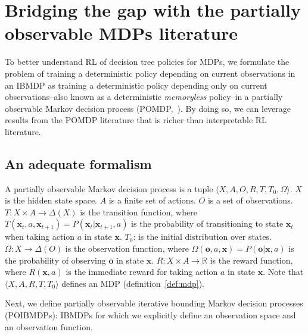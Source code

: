 \section{Bridging the gap with the partially observable MDPs literature}\label{sec:poibmdp}
To better understand RL of decision tree policies for MDPs, we formulate the problem of training a deterministic policy depending on current observations in an IBMDP as training a deterministic policy depending only on current observations--also known as a deterministic \emph{memoryless} policy--in a partially observable Markov decision process (POMDP,~\cite{POMDP,chap2}).
By doing so, we can leverage results from the POMDP literature that is richer than interpretable RL literature.

\subsection{An adequate formalism}
\begin{definition}\label{def:pomdp}
A partially observable Markov decision process is a tuple $\langle X, A, O, R, T, T_0, \Omega\rangle$. $X$ is the hidden state space.
$A$ is a finite set of actions.
$O$ is a set of observations.
$T: X \times A \rightarrow \Delta(X)$ is the transition function, where $T(\boldsymbol{x}_t, a, \boldsymbol{x}_{t+1}) = P(\boldsymbol{x}_t|\boldsymbol{x}_{t+1}, a)$ is the probability of transitioning to state $\boldsymbol{x}_{t}$ when taking action $a$ in state $\boldsymbol{x}$.
$T_0$: is the initial distribution over states. 
$\Omega: X \rightarrow \Delta(O)$ is the observation function, where $\Omega(\boldsymbol{o}, a, \boldsymbol{x}) = P(\boldsymbol{o}|\boldsymbol{x}, a)$ is the probability of observing $\boldsymbol{o}$ in state $\boldsymbol{x}$.
$R: X \times A \rightarrow \mathbb{R}$ is the reward function, where $R(\boldsymbol{x}, a)$ is the immediate reward for taking action $a$ in state $\boldsymbol{x}$.
Note that $\langle X, A, R, T, T_0 \rangle$ defines an MDP (definition~\ref{def:mdp}).
\end{definition}

Next, we define partially observable iterative bounding Markov decision processes (POIBMDPs): IBMDPs for which we explicitly define an observation space and an observation function.

